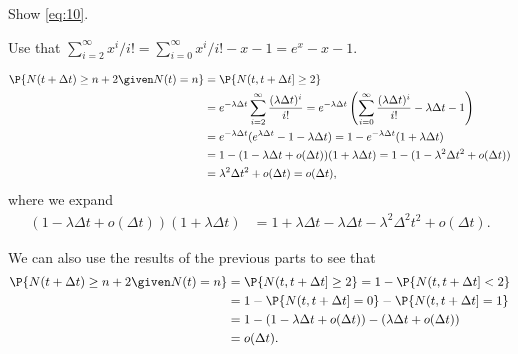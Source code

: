 \begin{exercise} \label{ex:p-35}
 Show \cref{eq:10}.
\begin{hint}
 Use that $\sum_{i=2}^\infty x^i/i! = \sum_{i=0}^\infty x^i/i! - x -1 = e^x -x - 1$.
\end{hint}
\begin{solution}
 \begin{align*}
 \P{N(t+\Delta t) \geq n+2 \given N(t) = n}
&= \P{N(t, t+\Delta t] \geq 2} \\
&= e^{-\lambda \Delta t} \sum_{i=2}^\infty \frac{(\lambda \Delta t)^i}{i!}
= e^{-\lambda \Delta t} \left(\sum_{i=0}^\infty \frac{(\lambda \Delta t)^i}{i!} - \lambda \Delta t - 1\right)\\
&= e^{-\lambda \Delta t}(e^{\lambda \Delta t} - 1 - \lambda \Delta t)
= 1 - e^{-\lambda \Delta t}(1 + \lambda \Delta t) \\
&= 1 - (1-\lambda \Delta t + o(\Delta t))(1+\lambda \Delta t)
= 1 - (1-\lambda^2 \Delta t^2 + o(\Delta t)) \\
&= \lambda^2 \Delta t^2 + o(\Delta t) = o(\Delta t),
 \end{align*}
where we expand
\begin{align*}
(1-\lambda \Delta t + o(\Delta t))(1+\lambda \Delta t)
&= 1 + \lambda \Delta t - \lambda \Delta t - \lambda^{2} \Delta^{2} t^{2} + o(\Delta t).
\end{align*}


We can also use the results of the previous parts to see that
\begin{align*}
 \P{N(t+\Delta t) \geq n+2 \given N(t) = n}
&= \P{N(t, t+\Delta t] \geq 2} = 1- \P{N(t, t+\Delta t]<2} \\
&= 1 - \P{N(t, t+\Delta t]= 0} - \P{N(t, t+\Delta t]=1} \\
&= 1 - (1-\lambda \Delta t + o(\Delta t) ) - (\lambda \Delta t + o(\Delta t)) \\
&= o(\Delta t).
\end{align*}
\end{solution}
\end{exercise}


